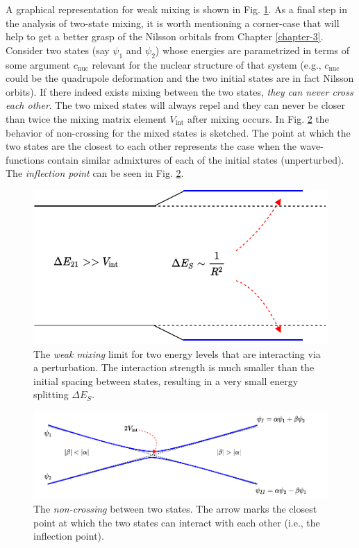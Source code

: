 A graphical representation for weak mixing is shown in Fig. \ref{weak-mixing-fig}. As a final step in the analysis of two-state mixing, it is worth mentioning a corner-case that will help to get a better grasp of the Nilsson orbitals from Chapter \ref{chapter-3}. Consider two states (say $\psi_1$ and $\psi_2$) whose energies are parametrized in terms of some argument $c_\text{nuc}$ relevant for the nuclear structure of that system (e.g., $c_\text{nuc}$ could be the quadrupole deformation and the two initial states are in fact Nilsson orbits). If there indeed exists mixing between the two states, \emph{they can never cross each other}. The two mixed states will always repel and they can never be closer than twice the mixing matrix element $V_\text{int}$ after mixing occurs. In Fig. \ref{fig-non-crossing} the behavior of non-crossing for the mixed states is sketched. The point at which the two states are the closest to each other represents the case when the wave-functions contain similar admixtures of each of the initial states (unperturbed). The \emph{inflection point} can be seen in Fig. \ref{fig-non-crossing}.
\begin{figure}
    \centering
    \includegraphics[scale=0.95]{Chapters/Figures/mixing_weak_coupling.pdf}
    \caption{The \emph{weak mixing} limit for two energy levels that are interacting via a perturbation. The interaction strength is much smaller than the initial spacing between states, resulting in a very small energy splitting $\Delta E_{S}$.}
    \label{weak-mixing-fig}
\end{figure}
\begin{figure}
    \centering
    \includegraphics[scale=0.9]{Chapters/Figures/state_non_crossing.pdf}
    \caption{The \emph{non-crossing} between two states. The arrow marks the closest point at which the two states can interact with each other (i.e., the inflection point).}
    \label{fig-non-crossing}
\end{figure}
